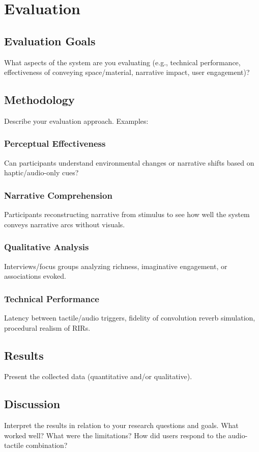 \chapter{Evaluation}
    \section{Evaluation Goals} What aspects of the system are you evaluating (e.g., technical performance, effectiveness of conveying space/material, narrative impact, user engagement)?
    \section{Methodology} Describe your evaluation approach. Examples:
        \subsection{Perceptual Effectiveness} Can participants understand environmental changes or narrative shifts based on haptic/audio-only cues?
        \subsection{Narrative Comprehension} Participants reconstructing narrative from stimulus to see how well the system conveys narrative arcs without visuals.
        \subsection{Qualitative Analysis} Interviews/focus groups analyzing richness, imaginative engagement, or associations evoked.
        \subsection{Technical Performance} Latency between tactile/audio triggers, fidelity of convolution reverb simulation, procedural realism of RIRs.
    \section{Results} Present the collected data (quantitative and/or qualitative).
    \section{Discussion} Interpret the results in relation to your research questions and goals. What worked well? What were the limitations? How did users respond to the audio-tactile combination?